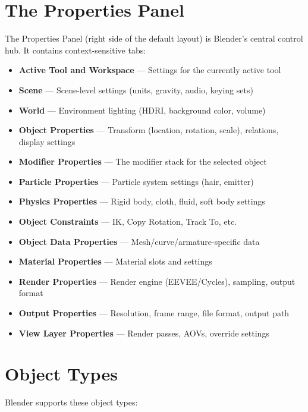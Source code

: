 \documentclass[11pt,letterpaper,twoside,openright]{book}
\begin{document}
\section{The Properties Panel}

The Properties Panel (right side of the default layout) is Blender's central control hub. It contains context-sensitive tabs:

\begin{itemize}[leftmargin=2em]
  \item \textbf{Active Tool and Workspace} --- Settings for the currently active tool
  \item \textbf{Scene} --- Scene-level settings (units, gravity, audio, keying sets)
  \item \textbf{World} --- Environment lighting (HDRI, background color, volume)
  \item \textbf{Object Properties} --- Transform (location, rotation, scale), relations, display settings
  \item \textbf{Modifier Properties} --- The modifier stack for the selected object
  \item \textbf{Particle Properties} --- Particle system settings (hair, emitter)
  \item \textbf{Physics Properties} --- Rigid body, cloth, fluid, soft body settings
  \item \textbf{Object Constraints} --- IK, Copy Rotation, Track To, etc.
  \item \textbf{Object Data Properties} --- Mesh/curve/armature-specific data
  \item \textbf{Material Properties} --- Material slots and settings
  \item \textbf{Render Properties} --- Render engine (EEVEE/Cycles), sampling, output format
  \item \textbf{Output Properties} --- Resolution, frame range, file format, output path
  \item \textbf{View Layer Properties} --- Render passes, AOVs, override settings
\end{itemize}

\section{Object Types}

Blender supports these object types:
\end{document}
